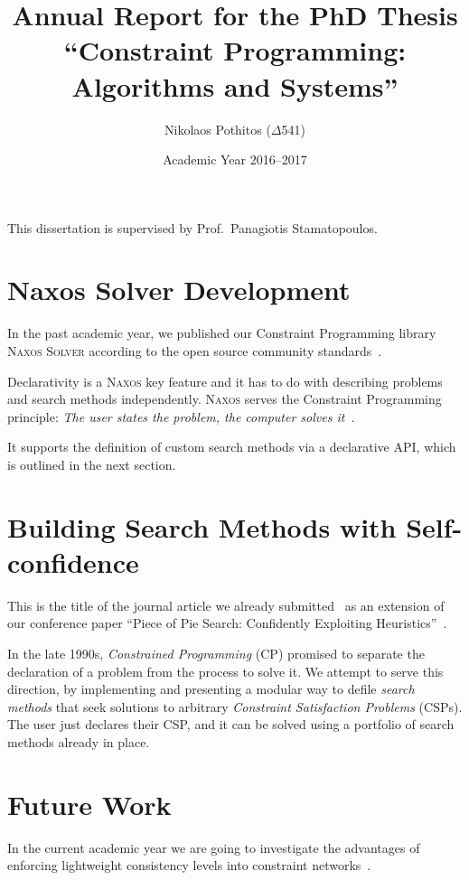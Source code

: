 \documentclass[a4paper]{article}
\begin{document}
\title{Annual Report for the PhD Thesis ``Constraint
       Programming: Algorithms and Systems''}

\author{Nikolaos Pothitos ($\Delta$541)}


\date{Academic Year 2016--2017}

\maketitle

This dissertation is supervised by Prof.~Panagiotis
Stamatopoulos.


\section{Naxos Solver Development}

In the past academic year, we published our Constraint
Programming library \textsc{Naxos Solver} according to the
open source community standards~\cite{Naxos}.

Declarativity is a \textsc{Naxos} key feature and it has to
do with describing problems and search methods
independently. \textsc{Naxos} serves the Constraint
Programming principle: \emph{The user states the problem,
the computer solves it}~\cite{Freuder2014}.

It supports the definition of custom search methods via a
declarative API, which is outlined in the next section.


\section{Building Search Methods with Self-confidence}

This is the title of the journal article we already
submitted~\cite{Pothitos2017} as an extension of our
conference paper ``Piece of Pie Search: Confidently
Exploiting Heuristics''~\cite{Pothitos2016-PoPS}.

In the late 1990s, \emph{Constrained Programming} (CP)
promised to separate the declaration of a problem from the
process to solve it. We attempt to serve this direction, by
implementing and presenting a modular way to defile
\emph{search methods} that seek solutions to arbitrary
\emph{Constraint Satisfaction Problems} (CSPs). The user
just declares their CSP, and it can be solved using a
portfolio of search methods already in place.


\section{Future Work}

In the current academic year we are going to investigate the
advantages of enforcing lightweight consistency levels into
constraint networks~\cite{Bessiere2006}.



\end{document}
